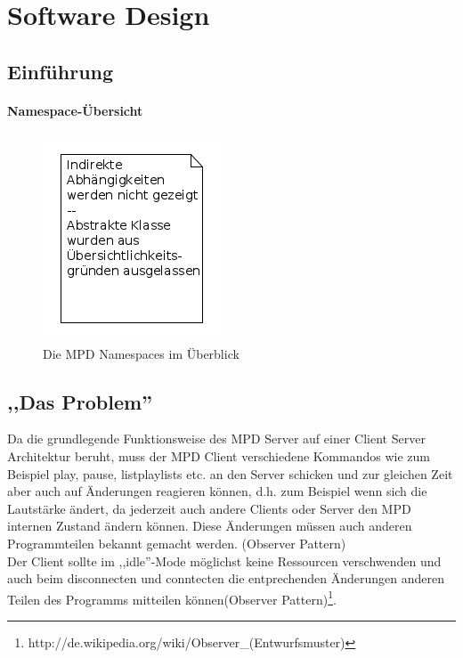 
\chapter{Software Design}

\section{Einführung}

\subsubsection{Namespace-Übersicht}

\begin{figure}[h!]
    \centering
    \includegraphics[scale=0.21]{Namespace_Uebersicht.png}
    \caption{Die MPD Namespaces im Überblick}
    \label{dd_namespaces}
\end{figure}

\section{,,Das Problem''}

Da die grundlegende Funktionsweise des MPD Server auf einer Client Server Architektur beruht, muss der MPD Client
verschiedene Kommandos wie zum Beispiel play, pause, listplaylists etc. an den Server schicken
und zur gleichen Zeit aber auch auf Änderungen reagieren können, d.h. zum Beispiel wenn sich die Lautstärke ändert,
da jederzeit auch andere Clients oder Server den MPD internen Zustand ändern können.
Diese Änderungen müssen auch anderen Programmteilen bekannt gemacht werden. (Observer Pattern)
\\
Der Client sollte im ,,idle''-Mode möglichst keine Ressourcen verschwenden und auch beim 
disconnecten und conntecten die entprechenden Änderungen anderen Teilen des Programms mitteilen
können(Observer Pattern)\footnote{http://de.wikipedia.org/wiki/Observer\_(Entwurfsmuster)}. 
\\

